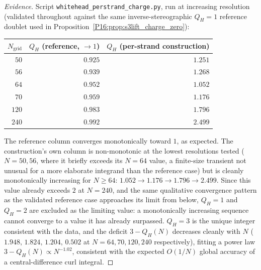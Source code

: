 \documentclass[11pt,a4paper]{article}
\theoremstyle{definition}\newtheorem{definition}[theorem]{Definition}
\theoremstyle{remark}
\theoremstyle{definition}\newtheorem{construction}[theorem]{Construction}
\newcommand{\QH}{Q_H}
\begin{document}
\begin{proof}[Evidence]
Script \texttt{whitehead\_perstrand\_charge.py}, run at increasing
resolution (validated throughout against the same inverse-stereographic
$\QH=1$ reference doublet used in Proposition~\ref{P16:prop:s3lift_charge_zero}):
\begin{center}
\renewcommand{\arraystretch}{1.2}
\begin{tabular}{rrr}
\toprule
$N_{\mathrm{grid}}$ & $\QH$ (reference, $\to1$) & $\QH$ (per-strand construction) \\
\midrule
$50$  & $0.925$ & $1.251$ \\
$56$  & $0.939$ & $1.268$ \\
$64$  & $0.952$ & $1.052$ \\
$70$  & $0.959$ & $1.176$ \\
$120$ & $0.983$ & $1.796$ \\
$240$ & $0.992$ & $2.499$ \\
\bottomrule
\end{tabular}
\end{center}
The reference column converges monotonically toward $1$, as expected.
The construction's own column is non-monotonic at the lowest
resolutions tested ($N=50,56$, where it briefly exceeds its
$N=64$ value, a finite-size transient not unusual for a more elaborate
integrand than the reference case) but is cleanly monotonically
increasing for $N\geq64$: $1.052\to1.176\to1.796\to2.499$. Since this
value already exceeds $2$ at $N=240$, and the same qualitative
convergence pattern as the validated reference case approaches its
limit from below, $\QH=1$ and $\QH=2$ are excluded as the limiting
value: a monotonically increasing sequence cannot converge to a value
it has already surpassed. $\QH=3$ is the unique integer consistent
with the data, and the deficit $3-\QH(N)$ decreases cleanly with $N$
($1.948,\,1.824,\,1.204,\,0.502$ at $N=64,70,120,240$ respectively),
fitting a power law $3-\QH(N)\propto N^{-1.02}$, consistent with the
expected $O(1/N)$ global accuracy of a central-difference curl
integral.
\end{proof}
\end{document}
